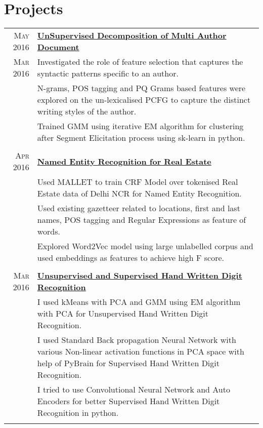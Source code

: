 \documentclass[a4paper,10pt]{article}
\begin{document}
\section{Projects}
\begin{longtable}{r|p{16cm}}

 \textsc{May 2016} & \textbf{\href{https://github.com/kautsiitd/Unsupervised-Decomposition-of-a-Multi-Author-Document}{UnSupervised Decomposition of Multi Author Document}}\\
 \textsc{Mar 2016} & Investigated the role of feature selection that captures the syntactic patterns specific to an author.\\
& N-grams, POS tagging and PQ Grams based features were explored on the un-lexicalised PCFG to capture the distinct writing styles of the author.\\
& Trained GMM using iterative EM algorithm for clustering after Segment Elicitation process using sk-learn in python.\\\multicolumn{2}{c}{}\\

\textsc{Apr 2016} & \textbf{\href{https://github.com/kautsiitd/NER-for-Real-Estate}{Named Entity Recognition for Real Estate}} \\
& Used MALLET to train CRF Model over tokenised Real Estate data of Delhi NCR for Named Entity Recognition.\\
& Used existing gazetteer related to locations, first and last names, POS tagging and Regular Expressions as feature of words.\\
& Explored Word2Vec model using large unlabelled corpus and used embeddings as features to achieve high F score.\\\multicolumn{2}{c}{}\\

\textsc{Mar 2016} & \textbf{\href{https://github.com/kautsiitd/Unsupervised-Hand-Written-Digit-Recognition}{Unsupervised and Supervised Hand Written Digit Recognition}} \\
& I used kMeans with PCA and GMM using EM algorithm with PCA for Unsupervised Hand Written Digit Recognition.\\
& I used Standard Back propagation Neural Network with various Non-linear  activation functions in PCA space with help of PyBrain for Supervised Hand Written Digit Recognition.\\
& I tried to use Convolutional Neural Network and Auto Encoders for better Supervised Hand Written Digit Recognition in python.\\\multicolumn{2}{c}{}\\


\end{longtable}
\end{document}
